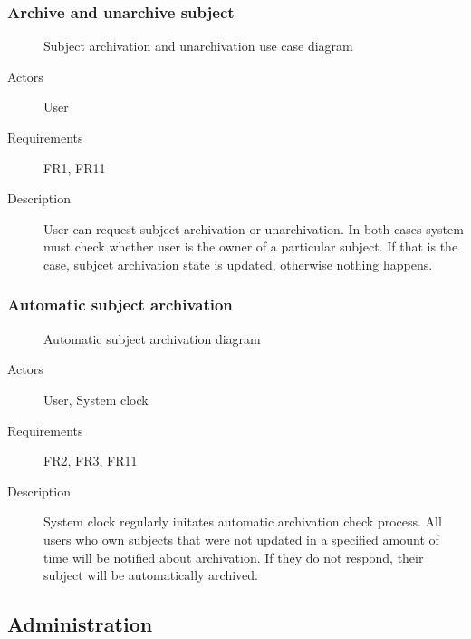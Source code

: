 \documentclass[
    english, %
]{VUMIFPSkursinis}
\begin{document}
\subsubsection{Archive and unarchive subject}

\begin{figure}[ht]
    \centering
    
    \label{archivation-use-case}
    \caption{Subject archivation and unarchivation use case diagram}
\end{figure}

\begin{description}
    \item[Actors] User
    \item[Requirements] FR1, FR11
    \item[Description] User can request subject archivation or unarchivation. In both cases system must check whether user is the owner of a particular subject. If that is the case, subjcet archivation state is updated, otherwise nothing happens.
\end{description}

\subsubsection{Automatic subject archivation}

\begin{figure}[ht]
    \centering
    
    \label{automatic-archivation-use-case}
    \caption{Automatic subject archivation diagram}
\end{figure}

\begin{description}
    \item[Actors] User, System clock
    \item[Requirements] FR2, FR3, FR11
    \item[Description] System clock regularly initates automatic archivation check process. All users who own subjects that were not updated in a specified amount of time will be notified about archivation. If they do not respond, their subject will be automatically archived.
\end{description}

\subsection{Administration}
\end{document}
